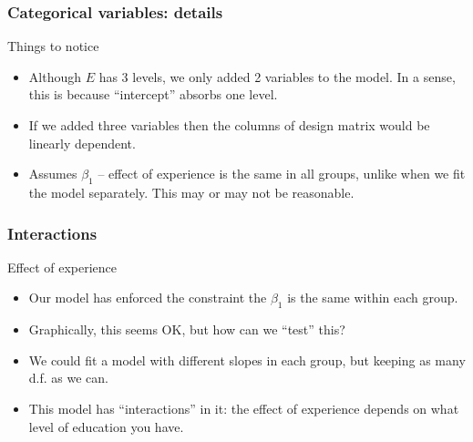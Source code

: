 \documentclass[handout]{beamer}
\begin{document}

   \begin{frame} \frametitle{Categorical variables: details}

   \begin{block}
   {Things to notice }
   \begin{itemize}

   \item Although $E$ has 3 levels, we only added 2 variables to the model.
   In a sense, this is because ``intercept'' absorbs one level.

   \item If we added three variables then the columns of design matrix would be linearly dependent.


   \item Assumes $\beta_1$ -- effect of experience is the same in all groups, unlike when we fit the model separately. This may or may not be reasonable.
   \end{itemize}
   \end{block}
   \end{frame}


   \begin{frame} \frametitle{Interactions}

   \begin{block}
   {Effect of experience}
   \begin{itemize}

   \item Our model has enforced the constraint the $\beta_1$ is the same within each group.

   \item Graphically, this seems OK, but how can we ``test'' this?

   \item We could fit a model with different slopes in each group, but keeping as many d.f. as we can.

   \item This model has ``interactions'' in it: the effect of experience depends on what level of education you have.
   \end{itemize}
   \end{block}
   \end{frame}

\end{document}
